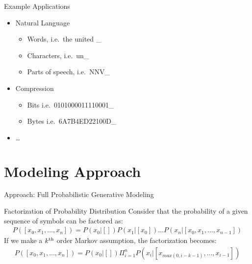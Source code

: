 \documentclass{beamer}
\begin{document}
\begin{frame}[t]{Example Applications}
	\begin{itemize}
		\item{Natural Language}
		\begin{itemize}
			\item Words, i.e.~the united \_
			\item Characters, i.e.~un\_
			\item Parts of speech, i.e.~NNV\_
		\end{itemize}

		\vspace{.75cm}		
		
		\item{Compression}
		\begin{itemize}
			\item  Bits i.e.~0101000011110001\_
			\item  Bytes i.e.~6A7B4ED22100D\_
		\end{itemize}
		
		\item \ldots
	\end{itemize}
	
\end{frame}

\section{Modeling Approach}

\begin{frame}[t]{Approach: Full Probabilistic Generative Modeling}

	\begin{block}{Factorization of Probability Distribution}
		Consider that the probability of a given sequence of symbols can be factored as:
		\begin{eqnarray*}
			P([x_0, x_1, \ldots, x_n]) = P(x_0 | [])P(x_1 | [x_0]) \ldots P(x_n | [x_0, x_1, \ldots, x_{n-1}])
		\end{eqnarray*}
		If we make a $k^{\rm th}$ order Markov assumption, the factorization becomes:
		\begin{eqnarray*}
			P([x_0, x_1, \ldots, x_n]) = P(x_0  | [] ) \Pi_{i = 1}^n P(x_i | [x_{max(0, i-k-1)}, \ldots, x_{i-1}])
		\end{eqnarray*}
	\end{block}
\end{frame}
\end{document}
